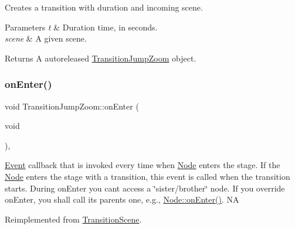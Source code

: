 Creates a transition with duration and incoming scene.


\begin{DoxyParams}{Parameters}
{\em t} & Duration time, in seconds. \\
\hline
{\em scene} & A given scene. \\
\hline
\end{DoxyParams}
\begin{DoxyReturn}{Returns}
A autoreleased \hyperlink{classTransitionJumpZoom}{Transition\+Jump\+Zoom} object. 
\end{DoxyReturn}
\mbox{\label{classTransitionJumpZoom_aa57e87e6adf5e62f533d5478fdd6155e}} 
\subsubsection{\texorpdfstring{on\+Enter()}{onEnter()}\hspace{0.1cm}{\footnotesize\ttfamily [1/2]}}
{\footnotesize\ttfamily void Transition\+Jump\+Zoom\+::on\+Enter (\begin{DoxyParamCaption}\item[{void}]{ }\end{DoxyParamCaption})\hspace{0.3cm}{\ttfamily [override]}, {\ttfamily [virtual]}}

\hyperlink{classEvent}{Event} callback that is invoked every time when \hyperlink{classNode}{Node} enters the \textquotesingle{}stage\textquotesingle{}. If the \hyperlink{classNode}{Node} enters the \textquotesingle{}stage\textquotesingle{} with a transition, this event is called when the transition starts. During on\+Enter you can\textquotesingle{}t access a \char`\"{}sister/brother\char`\"{} node. If you override on\+Enter, you shall call its parent\textquotesingle{}s one, e.\+g., \hyperlink{classNode_a7f51764c4afd5018a052b9ef71c03374}{Node\+::on\+Enter()}.  NA 

Reimplemented from \hyperlink{classTransitionScene_aace390a1bd8f3c73bb650a1e256a0f83}{Transition\+Scene}.

\mbox{\label{classTransitionJumpZoom_a06952f1bbf702804d28bda0923d9ca31}} 
